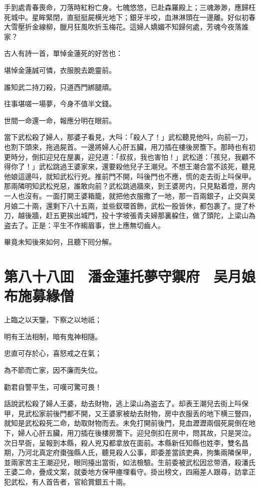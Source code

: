 手到處青春喪命，刀落時紅粉亡身。七魄悠悠，已赴森羅殿上；三魂渺渺，應歸枉死城中。星眸緊閉，直挺挺屍横光地下；銀牙半咬，血淋淋頭在一邊離。好似初春大雪壓折金線柳，臘月狂風吹折玉梅花。這婦人嬌媚不知歸何處，芳魂今夜落誰家？

古人有詩一首，單悼金蓮死的好苦也：

堪悼金蓮誠可憐，衣服脫去跪靈前。

誰知武二持刀殺，只道西門綁腿頑。

往事堪嗟一場夢，今身不值半文錢。

世間一命還一命，報應分明在眼前。

當下武松殺了婦人，那婆子看見，大呌：「殺人了！」武松聽見他呌，向前一刀，也割下頭來，拖過屍首。一邊將婦人心肝五臟，用刀插在樓後房簷下。那時也有初更時分，倒扣迎兒在屋裏，迎兒道：「叔叔，我也害怕！」武松道：「孩兒，我顧不得你了！」武松跳過王婆家來，還要殺他兒子王潮兒。不想王潮合當不該死，聽見他娘這邊呌，就知武松行兇。推前門不開，呌後門也不應，慌的走去街上呌保甲。那兩隣明知武松兇惡，誰敢向前？武松跳過牆來，到王婆房内，只見點着燈，房内一人也沒有。一面打開王婆箱籠，就把他衣服撒了一地，那一百兩銀子，止交與吴月娘二十兩，還剩下八十五兩，並些釵環首飾，武松一股皆休，都包裹了。提了朴刀，越後牆，赶五更挨出城門，投十字坡張青夫婦那裏躱住，做了頭陀，上梁山為盗去了。正是：平生不作縐眉事，世上應無切齒人。

畢竟未知後來如何，且聽下囘分解。

\chapter*{第八十八囬　潘金蓮托夢守禦府　吴月娘布施募緣僧}

上臨之以天鑒，下察之以地祇；

明有王法相制，暗有鬼神相隨。

忠直可存於心，喜怒戒之在氣；

為不節而亡家，因不廉而失位。

勸君自警平生，可嘆可驚可畏！

話說武松殺了婦人王婆，劫去財物，逃上梁山為盗去了。却表王潮兒去街上呌保甲，見武松家前後門都不開，又王婆家被劫去財物，房中衣服丢的地下横三豎四，就知是武松殺死二命，劫取財物而去。未免打開前後門，見血瀝瀝兩個死屍倒在地下，婦人心肝五臟，用刀插在後樓房簷下。迎兒倒扣在房中，問其故，只是哭泣。次日早衙，呈報到本縣，殺人兇刄都拿放在面前。本縣新任知縣也姓李，雙名昌期，乃河北真定府棗強縣人氏，聽見殺人公事，即委差當該吏典，拘集兩隣保甲，並兩家苦主王潮迎兒，眼同擡出當街，如法檢驗。生前委被武松因忿带酒，殺潘氏王婆二命，疊成文案，就委地方保甲瘞埋看守。掛出榜文，四廂差人跟尋，訪拿正犯武松，有人首告者，官給賞銀五十兩。

